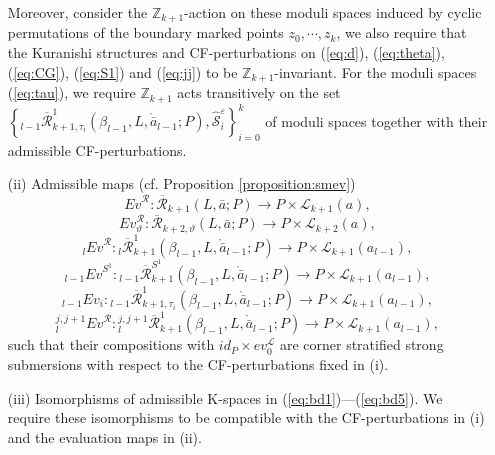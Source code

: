 \documentclass[a4paper]{article}
\numberwithin{equation}{section}
\begin{document}
\begin{itemize}
    Moreover, consider the $\mathbb{Z}_{k+1}$-action on these moduli spaces induced by cyclic permutations of the boundary marked points $z_0,\cdots,z_k$, we also require that the Kuranishi structures and CF-perturbations on (\ref{eq:d}), (\ref{eq:theta}), (\ref{eq:CG}), (\ref{eq:S1}) and (\ref{eq:jj}) to be $\mathbb{Z}_{k+1}$-invariant. For the moduli spaces (\ref{eq:tau}), we require $\mathbb{Z}_{k+1}$ acts transitively on the set $\left\{{}_{l-1}\overline{\mathcal{R}}_{k+1,\tau_i}^1(\beta_{l-1},L,\ring{\bar{a}}_{l-1};P),\widehat{\mathcal{S}}_i^\varepsilon\right\}_{i=0}^k$ of moduli spaces together with their admissible CF-perturbations.
    \item[(ii)] Admissible maps (cf. Proposition \ref{proposition:smev})
    \begin{equation}\label{eq:ev1}
    \mathit{Ev}^\mathcal{R}:\overline{\mathcal{R}}_{k+1}(L,\bar{a};P)\rightarrow P\times\mathcal{L}_{k+1}(a),
    \end{equation}
    \begin{equation}\label{eq:ev2}
    \mathit{Ev}_\vartheta^\mathcal{R}:\overline{\mathcal{R}}_{k+2,\vartheta}(L,\bar{a};P)\rightarrow P\times\mathcal{L}_{k+2}(a),
    \end{equation}
    \begin{equation}\label{eq:ev3}
    {}_l\mathit{Ev}^\mathcal{R}:{}_l\overline{\mathcal{R}}_{k+1}^1(\beta_{l-1},L,\ring{\bar{a}}_{l-1};P)\rightarrow P\times\mathcal{L}_{k+1}(a_{l-1}),
    \end{equation}
    \begin{equation}\label{eq:ev4}
    {}_{l-1}\mathit{Ev}^{S^1}: {}_{l-1}\overline{\mathcal{R}}^{S^1}_{k+1}(\beta_{l-1},L,\ring{\bar{a}}_{l-1};P)\rightarrow P\times\mathcal{L}_{k+1}(a_{l-1}),
    \end{equation}
    \begin{equation}\label{eq:ev5}
    {}_{l-1}\mathit{Ev}_i:{}_{l-1}\overline{\mathcal{R}}_{k+1,\tau_i}^1(\beta_{l-1},L,\ring{\bar{a}}_{l-1};P)\rightarrow P\times\mathcal{L}_{k+1}(a_{l-1}),
    \end{equation}
    \begin{equation}\label{eq:ev6}
    {}_l^{j,j+1}\mathit{Ev}^\mathcal{R}:{}_l^{j,j+1}\overline{\mathcal{R}}_{k+1}^1(\beta_{l-1},L,\ring{\bar{a}}_{l-1};P)\rightarrow P\times\mathcal{L}_{k+1}(a_{l-1}),
    \end{equation}
    such that their compositions with $\mathit{id}_P\times\mathit{ev}_0^\mathcal{L}$ are corner stratified strong submersions with respect to the CF-perturbations fixed in (i).
    \item[(iii)] Isomorphisms of admissible K-spaces in (\ref{eq:bd1})---(\ref{eq:bd5}). We require these isomorphisms to be compatible with the CF-perturbations in (i) and the evaluation maps in (ii).
\end{itemize}
\end{document}
